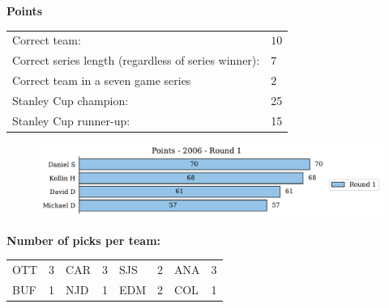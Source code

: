 \documentclass[10pt]{article}
\begin{document}
\begin{table}[!htb]
\begin{minipage}[t]{.27\linewidth}
{\bf Points}\\
\begin{tabular}{l l}
    Correct team:	& $10$\\
    Correct series length (regardless of series winner):	& $7$\\
    Correct team in a seven game series    & $2$\\
    Stanley Cup champion:	& 25\\
    Stanley Cup runner-up:	& 15\\
\end{tabular}
\hspace{0.5cm}
\begin{figure}
    \vspace{-3cm}
	\includegraphics[width=5in]{../../figures/2006/Points-2006-Round1.pdf}
\end{figure}
\end{minipage}
\end{table}

\begin{minipage}[t]{.45\linewidth}
{\bf Number of picks per team:}\\
\begin{tabular}{lc | lc | lc | lc }
    OTT & 3 & CAR & 3 & SJS & 2 & ANA & 3 \\
    BUF & 1 & NJD & 1 & EDM & 2 & COL & 1 \\
\end{tabular}
\end{minipage}
\end{document}
